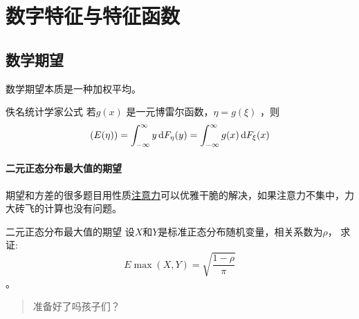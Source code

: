 \chapter{数字特征与特征函数}
\section{数学期望}
数学期望本质是一种加权平均。

\begin{theorem}{佚名统计学家公式}
    若\(g(x)\) 是一元博雷尔函数，\(\eta=g(\xi)\) ，则\[
        (E(\eta)) = \int_{-\infty}^{\infty} y \d{F_{\eta}}(y) =
        \int_{-\infty}^{\infty} g(x) \d{F_{\xi}}(x)
    \]
\end{theorem}
\subsubsection{二元正态分布最大值的期望}
期望和方差的很多题目用性质\underline{注意力}可以优雅干脆的解决，如果注意力不集中，力大砖飞的计算也没有问题。

\begin{problem}{二元正态分布最大值的期望}
    设\(X\)和\(Y\)是标准正态分布随机变量，相关系数为\(\rho\)，
    求证:\[E\max(X,Y)= \sqrt{\frac{1-\rho}{\pi}}\]。
\end{problem}

\begin{quote}
    准备好了吗孩子们？
\end{quote}

